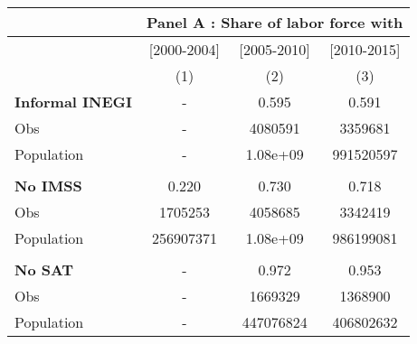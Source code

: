 \begin{tabular}{lccc}
\toprule
      & \multicolumn{3}{c}{Panel A : Share of labor force with} \\
\midrule
      & [2000-2004] & [2005-2010] & [2010-2015] \\
\midrule
      & (1)   & (2)   & (3) \\
\midrule
\midrule
\textbf{Informal INEGI} & -     & 0.595 & 0.591 \\
Obs   & -     & 4080591 & 3359681 \\
Population & -     & 1.08e+09 & 991520597 \\
      &       &       &  \\
\textbf{No IMSS} & 0.220 & 0.730 & 0.718 \\
Obs   & 1705253 & 4058685 & 3342419 \\
Population & 256907371 & 1.08e+09 & 986199081 \\
      &       &       &  \\
\textbf{No SAT} & -     & 0.972 & 0.953 \\
Obs   & -     & 1669329 & 1368900 \\
Population & -     & 447076824 & 406802632 \\
\bottomrule
\bottomrule
\end{tabular}%
